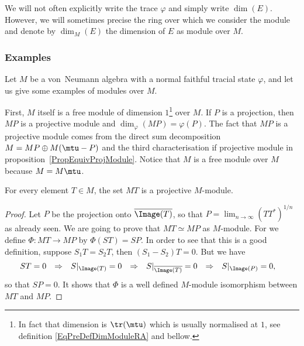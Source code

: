 We will not often explicitly write the trace $\varphi$ and simply write $\dim(E)$. However, we will sometimes precise the ring over which we consider the module and denote by $\dim_M(E)$ the dimension of $E$ as module over $M$.

\subsubsection{Examples}		\label{subsubsecExemDimMMMod}

Let $M$ be a von~Neumann algebra with a normal faithful tracial state $\varphi$, and let us give some examples of modules over $M$.

First, $M$ itself is a free module of dimension $1$\footnote{In fact that dimension is $\tr(\mtu)$ which is usually normalised at $1$, see definition \eqref{EqPreDefDimModuleRA} and bellow.} over $M$. If $P$ is a projection, then $MP$ is a projective module\label{PgMPprojModule} and $\dim_{\varphi}(MP)=\varphi(P)$. The fact that $MP$ is a projective module comes from the direct sum decomposition $M=MP\oplus M(\mtu-P)$ and the third characterisation if projective module in proposition~\ref{PropEquivProjModule}. Notice that $M$ is a free module over $M$ because $M=M\mtu$.

\begin{proposition}		\label{PropMTprojpourtoutT}
	For every element $T\in M$, the set $MT$ is a projective $M$-module.
\end{proposition}

\begin{proof}
	Let $P$ be the projection onto $\overline{ \Image(T) }$, so that $P=\lim_{n\to\infty}(TT^*)^{1/n}$ as already seen. We are going to prove that $MT\simeq MP$ as $M$-module. For we define $\Phi\colon MT\to MP$ by $\Phi(ST)=SP$. In order to see that this is a good definition, suppose $S_1T=S_2T$, then $(S_1-S_2)T=0$. But we have
	\begin{align}
		ST & =0 & \Rightarrow &  & S|_{\Image(T)} & =0 & \Rightarrow &  & S|_{\overline{ \Image(T) }} & =0 & \Rightarrow &  & S|_{\Image(P)} & =0,
	\end{align}
	so that $SP=0$. It shows that $\Phi$ is a well defined $M$-module isomorphism between $MT$ and $MP$.
\end{proof}

